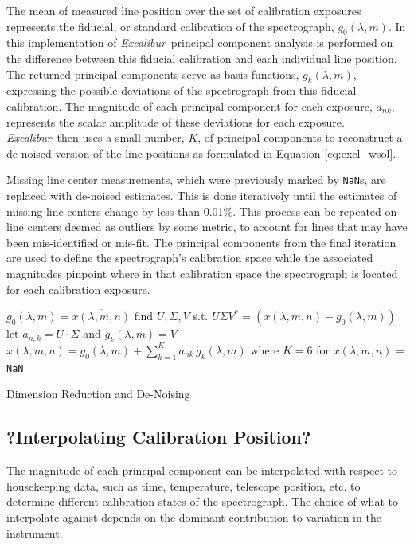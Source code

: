 \documentclass[modern]{aastex63}
\newcommand{\project}[1]{\textsl{#1}}
\newcommand{\name}{\project{Excalibur}}
\newcommand{\code}[1]{\texttt{#1}}
\begin{document}
The mean of measured line position over the set of calibration exposures represents the fiducial, or standard calibration of the spectrograph, $g_0(\lambda,m)$.  In this implementation of \name\, principal component analysis is performed on the difference between this fiducial calibration and each individual line position.  The returned principal components serve as basis functions,  $g_k(\lambda,m)$, expressing the possible deviations of the spectrograph from this fiducial calibration.  The magnitude of each principal component for each exposure, $a_{nk}$, represents the scalar amplitude of these deviations for each exposure.  \name\ then uses a small number, $K$, of principal components to reconstruct a de-noised version of the line positions as formulated in Equation \ref{eq:excl_wsol}.

Missing line center measurements, which were previously marked by \code{NaN}s, are replaced with de-noised estimates.  This is done iteratively until the estimates of missing line centers change by less than 0.01\%.  This process can be repeated on line centers deemed as outliers by some metric, to account for lines that may have been mis-identified or mis-fit.  The principal components from the final iteration are used to define the spectrograph's calibration space while the associated magnitudes pinpoint where in that calibration space the spectrograph is located for each calibration exposure.

\begin{algorithm}
\SetAlgoLined
{}
{
	$g_0(\lambda,m) = \overline{x(\lambda,m,n)}$\;
	find $U, \Sigma, V$ s.t. $U\Sigma V^* = (x(\lambda,m,n)-g_0(\lambda,m))$\;
	let $a_{n,k} = U\cdot \Sigma$ and $g_k(\lambda,m) = V$\;
	$x(\lambda,m,n) = g_0(\lambda,m) + \sum_{k=1}^K a_{nk}\,g_k(\lambda,m)$ where $K=6$ for $x(\lambda,m,n)$ = \code{NaN}
	}
\caption{Dimension Reduction and De-Noising}
\end{algorithm}

\subsection{?Interpolating Calibration Position?}
 \label{sec:interp_time}
The magnitude of each principal component can be interpolated with respect to housekeeping data, such as time, temperature, telescope position, etc. to determine different calibration states of the spectrograph.  The choice of what to interpolate against depends on the dominant contribution to variation in the instrument.
\end{document}
